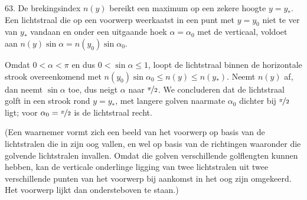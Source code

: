 \begin{problem}{63.}
    De brekingsindex $n(y)$ bereikt een maximum op een zekere hoog\-te $y = y_*$. Een lichtstraal die op een voorwerp weerkaatst in een punt met $y = y_0$ niet te ver van $y_*$ vandaan en onder een uitgaande hoek $\alpha = {\alpha}_0$ met de verticaal, voldoet aan $n(y) \sin \alpha = n(y_0) \sin {\alpha}_0$.

    Omdat $0 < \alpha < \pi$ en dus $0 < \sin \alpha \leq 1$, loopt de lichtstraal binnen de horizontale strook overeenkomend met \mbox{$n(y_0) \sin {\alpha}_0 \leq n(y) \leq n(y_*)$}. Neemt $n(y)$ af, dan neemt $\sin \alpha$ toe, dus neigt $\alpha$ naar $\nicefrac{\pi}{2}$. We conclu\-deren dat de lichtstraal golft in een strook rond $y = y_*$, met langere golven naarmate ${\alpha}_0$ dichter bij $\nicefrac{\pi}{2}$ ligt; voor ${\alpha}_0 = \nicefrac{\pi}{2}$ is de lichtstraal recht.

    (Een waarnemer vormt zich een beeld van het voorwerp op basis van de lichtstralen die in zijn oog vallen, en wel op basis van de richtingen waaronder die golvende lichtstralen invallen. Omdat die golven verschillende golflengten kunnen hebben, kan de verticale on\-derlinge ligging van twee lichtstralen uit twee verschillende punten van het voorwerp bij aankomst in het oog zijn omgekeerd. Het voorwerp lijkt dan ondersteboven te staan.)
\end{problem}

\clearpage

